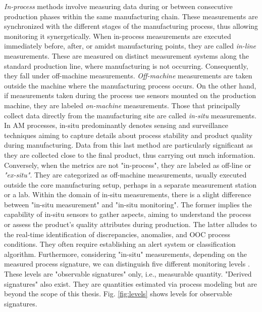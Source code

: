 \emph{In-process} methods involve measuring data during or between consecutive production phases within the same manufacturing chain. These measurements are synchronized with the different stages of the manufacturing process, thus allowing monitoring it synergetically. When in-process measurements are executed immediately before, after, or amidst manufacturing points, they are called \emph{in-line} measurements. These are measured on distinct measurement systems along the standard production line, where manufacturing is not occurring. Consequently, they fall under off-machine measurements. \emph{Off-machine} measurements are taken outside the machine where the manufacturing process occurs. On the other hand, if measurements taken during the process use sensors mounted on the production machine, they are labeled \emph{on-machine} measurements. Those that principally collect data directly from the manufacturing site are called \emph{in-situ} measurements. In AM processes, in-situ predominantly denotes sensing and surveillance techniques aiming to capture details about process stability and product quality during manufacturing. Data from this last method are particularly significant as they are collected close to the final product, thus carrying out much information. Conversely, when the metrics are not "in-process", they are labeled as off-line or \emph{"ex-situ"}. They are categorized as off-machine measurements, usually executed outside the core manufacturing setup, perhaps in a separate measurement station or a lab. Within the domain of in-situ measurements, there is a slight difference between "in-situ measurement" and "in-situ monitoring". The former implies the capability of in-situ sensors to gather aspects, aiming to understand the process or assess the product's quality attributes during production. The latter alludes to the real-time identification of discrepancies, anomalies, and OOC process conditions. They often require establishing an alert system or classification algorithm. Furthermore, considering "in-situ" measurements, depending on the measured process signature, we can distinguish five different monitoring levels \cite{grasso_-situ_2021, grasso_process_2017}. These levels are "observable signatures" only, i.e., measurable quantity. "Derived signatures" also exist. They are quantities estimated via process modeling but are beyond the scope of this thesis. Fig. \ref{fig:levels} shows levels for observable signatures.
